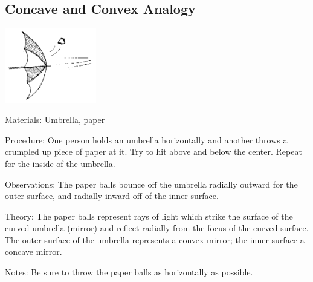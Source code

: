 \begin{multicols}{2}
\vfill
\columnbreak

\subsection{Concave and Convex Analogy}

\begin{center}
\includegraphics[width=0.3\textwidth]{./img/source/umbrella.png}
\end{center}

\begin{description*}
\item[Materials:]{Umbrella, paper}
\item[Procedure:]{One person holds an umbrella horizontally and another throws a crumpled up piece of paper at it. Try to hit above and below the center. Repeat for the inside of the umbrella.}
\item[Observations:]{The paper balls bounce off the umbrella radially outward for the outer surface, and radially inward off of the inner surface.}
\item[Theory:]{The paper balls represent rays of light which strike the surface of the curved umbrella (mirror) and reflect radially from the focus of the curved surface. The outer surface of the umbrella represents a convex mirror; the inner surface a concave mirror.}
\item[Notes:]{Be sure to throw the paper balls as horizontally as possible.}
\end{description*}


\end{multicols}
